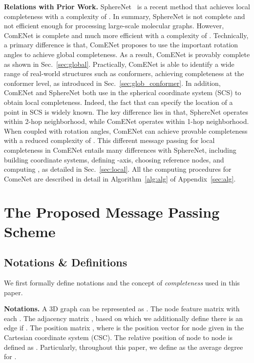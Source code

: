 \documentclass{article}
\begin{document}
\textbf{Relations with Prior Work.}
SphereNet~\citep{liu2022spherical} is a recent method that 
achieves local completeness with a complexity of .
In summary, SphereNet is not complete and not efficient enough for processing large-scale molecular graphs.
However, ComENet is complete and much more efficient with a complexity of .
Technically, a primary difference is that, ComENet
proposes to use the important rotation angles to achieve global
completeness.
As a result, ComENet is provably complete as shown in Sec.~\ref{sec:global}.
Practically, ComENet is able to identify a wide range of real-world
structures such as conformers, achieving completeness
at the conformer level,
as introduced in 
Sec.~\ref{sec:glob_conformer}.
In addition, ComENet and SphereNet both use  in the spherical coordinate system (SCS) to obtain local completeness. 
Indeed, the fact that  can specify the location of a point in SCS is widely known. The key difference lies in that, SphereNet
operates within 2-hop neighborhood, while ComENet operates within 1-hop neighborhood. When coupled with rotation angles, ComENet can achieve provable completeness with a reduced complexity of .
This different message passing for local completeness in ComENet entails many differences with SphereNet, including building coordinate systems, defining -axis, choosing reference nodes, and computing ,
as detailed in Sec.~\ref{sec:local}.
All the computing procedures for ComeNet are described in detail in Algorithm~\ref{alg:alg} of Appendix~\ref{sec:alg}.


\vspace{-5pt}
\section{The Proposed Message Passing Scheme}

\subsection{Notations \& Definitions} \label{sec:def}
We first formally define notations and the concept of \emph{completeness} used in this paper.

\textbf{Notations.}
A 3D graph  can be represented as .
The node feature matrix 
with each .
The adjacency matrix ,
based on which we additionally define there is an edge  if .
The position matrix ,
where  is the position vector for node 
given in the Cartesian coordinate system (CSC).
The relative position  of node  to node  is defined as
.
Particularly, throughout this paper, we define  as the average degree
for .
\end{document}
